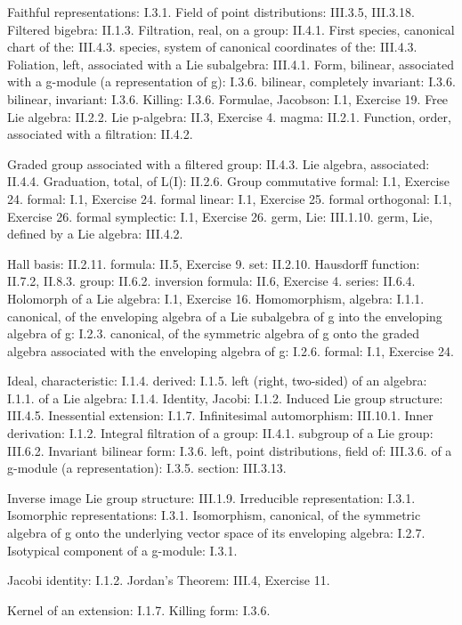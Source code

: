 Faithful representations: I.3.1. Field of point distributions: III.3.5, III.3.18. Filtered bigebra: II.1.3. Filtration, real, on a group: II.4.1. First species, canonical chart of the: III.4.3. species, system of canonical coordinates of the: III.4.3. Foliation, left, associated with a Lie subalgebra: III.4.1. Form, bilinear, associated with a g-module (a representation of g): I.3.6. bilinear, completely invariant: I.3.6. bilinear, invariant: I.3.6. Killing: I.3.6. Formulae, Jacobson: I.1, Exercise 19. Free Lie algebra: II.2.2. Lie p-algebra: II.3, Exercise 4. magma: II.2.1. Function, order, associated with a filtration: II.4.2.

Graded group associated with a filtered group: II.4.3. Lie algebra, associated: II.4.4. Graduation, total, of L(I): II.2.6. Group commutative formal: I.1, Exercise 24. formal: I.1, Exercise 24. formal linear: I.1, Exercise 25. formal orthogonal: I.1, Exercise 26. formal symplectic: I.1, Exercise 26. germ, Lie: III.1.10. germ, Lie, defined by a Lie algebra: III.4.2.

Hall basis: II.2.11. formula: II.5, Exercise 9. set: II.2.10. Hausdorff function: II.7.2, II.8.3. group: II.6.2. inversion formula: II.6, Exercise 4. series: II.6.4. Holomorph of a Lie algebra: I.1, Exercise 16. Homomorphism, algebra: I.1.1. canonical, of the enveloping algebra of a Lie subalgebra of g into the enveloping algebra of g: I.2.3. canonical, of the symmetric algebra of g onto the graded algebra associated with the enveloping algebra of g: I.2.6. formal: I.1, Exercise 24.

Ideal, characteristic: I.1.4. derived: I.1.5. left (right, two-sided) of an algebra: I.1.1. of a Lie algebra: I.1.4. Identity, Jacobi: I.1.2. Induced Lie group structure: III.4.5. Inessential extension: I.1.7. Infinitesimal automorphism: III.10.1. Inner derivation: I.1.2. Integral filtration of a group: II.4.1. subgroup of a Lie group: III.6.2. Invariant bilinear form: I.3.6. left, point distributions, field of: III.3.6. of a g-module (a representation): I.3.5. section: III.3.13.

Inverse image Lie group structure: III.1.9. Irreducible representation: I.3.1. Isomorphic representations: I.3.1. Isomorphism, canonical, of the symmetric algebra of g onto the underlying vector space of its enveloping algebra: I.2.7. Isotypical component of a g-module: I.3.1.

Jacobi identity: I.1.2. Jordan's Theorem: III.4, Exercise 11.

Kernel of an extension: I.1.7. Killing form: I.3.6.

